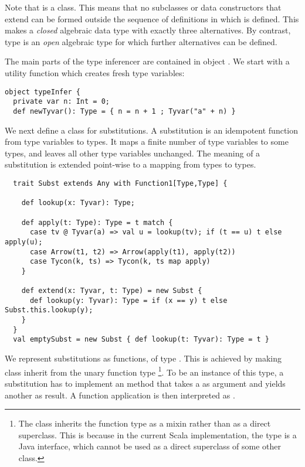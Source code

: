 {Note that  is a  class. This means that no
subclasses or data constructors that extend  can be formed
outside the sequence of definitions in which  is defined.
This makes  a {\em closed} algebraic data type with exactly
three alternatives. By contrast, type  is an {\em open}
algebraic type for which further alternatives can be defined.

The main parts of the type inferencer are contained in object
. We start with a utility function which creates
fresh type variables:
\begin{lstlisting}
object typeInfer {
  private var n: Int = 0;
  def newTyvar(): Type = { n = n + 1 ; Tyvar("a" + n) }
\end{lstlisting}
We next define a class for substitutions. A substitution is an
idempotent function from type variables to types. It maps a finite
number of type variables to some types, and leaves all other type
variables unchanged. The meaning of a substitution is extended
point-wise to a mapping from types to types.
\begin{lstlisting}
  trait Subst extends Any with Function1[Type,Type] {

    def lookup(x: Tyvar): Type;

    def apply(t: Type): Type = t match {
      case tv @ Tyvar(a) => val u = lookup(tv); if (t == u) t else apply(u); 
      case Arrow(t1, t2) => Arrow(apply(t1), apply(t2))
      case Tycon(k, ts) => Tycon(k, ts map apply)
    }

    def extend(x: Tyvar, t: Type) = new Subst {
      def lookup(y: Tyvar): Type = if (x == y) t else Subst.this.lookup(y);
    }
  }
  val emptySubst = new Subst { def lookup(t: Tyvar): Type = t }
\end{lstlisting}
We represent substitutions as functions, of type . This is achieved by making class  inherit from the
unary function type \footnote{
The class inherits the function type as a mixin rather than as a direct 
superclass. This is because in the current Scala implementation, the
 type is a Java interface, which cannot be used as a direct
superclass of some other class.}.
To be an instance
of this type, a substitution  has to implement an 
method that takes a  as argument and yields another
 as result. A function application  is then
interpreted as .

}
